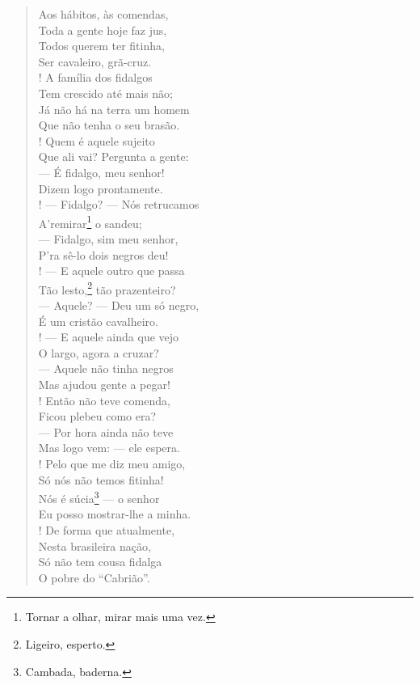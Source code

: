 \begin{verse}
Aos hábitos, às comendas,\\
Toda a gente hoje faz jus,\\
Todos querem ter fitinha,\\
Ser cavaleiro, grã-cruz.\\!
A família dos fidalgos\\
Tem crescido até mais não;\\
Já não há na terra um homem\\
Que não tenha o seu brasão.\\!
Quem é aquele sujeito\\
Que ali vai? Pergunta a gente:\\
--- É fidalgo, meu senhor!\\
Dizem logo prontamente.\\!
--- Fidalgo? --- Nós retrucamos\\
A'remirar\footnote{ Tornar a olhar, mirar mais uma vez.} o sandeu;\\
--- Fidalgo, sim meu senhor,\\
P'ra sê-lo dois negros deu!\\!
--- E aquele outro que passa\\
Tão lesto,\footnote{ Ligeiro, esperto.} tão prazenteiro?\\
--- Aquele? --- Deu um só negro,\\
É um cristão cavalheiro.\\!
--- E aquele ainda que vejo\\
O largo, agora a cruzar?\\
--- Aquele não tinha negros\\
Mas ajudou gente a pegar!\\!
Então não teve comenda,\\
Ficou plebeu como era?\\
--- Por hora ainda não teve\\
Mas logo vem: --- ele espera.\\!
Pelo que me diz meu amigo,\\
Só nós não temos fitinha!\\
Nós é súcia\footnote{ Cambada, baderna.} --- o senhor\\
Eu posso mostrar-lhe a minha.\\!
De forma que atualmente,\\
Nesta brasileira nação,\\
Só não tem cousa fidalga\\
O pobre do ``Cabrião''.
\end{verse}

